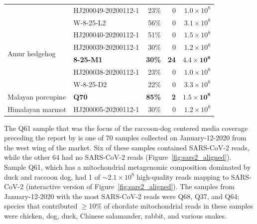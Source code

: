 \documentclass[9pt,twocolumn,twoside]{gsajnl_modified}
\begin{document}
\begin{table}
{\begin{tabular}{llrrr}
                 & HJ200049-20200112-1 &                                23\% &                        0 &                     $1.0 \times 10^8$ \\
\cline{1-5}
\multirow{6}{*}{Amur hedgehog} & W-8-25-L2 &                                56\% &                        0 &                   $3.1 \times 10^8$ \\
                 & HJ200040-20200112-1 &                                51\% &                        0 &                   $1.5 \times 10^8$ \\
                 & HJ200039-20200112-1 &                                30\% &                        0 &                   $1.2 \times 10^8$ \\
                 & {\bf 8-25-M1} &                                {\bf 30\%} &                      {\bf 24} &                   $\mathbf{4.4 \times 10^8}$ \\
                 & HJ200038-20200112-1 &                                23\% &                        0 &                     $1.0 \times 10^8$ \\
                 & W-8-25-D2 &                                22\% &                        0 &                   $3.3 \times 10^8$ \\
\cline{1-5}
Malayan porcupine & {\bf Q70} &                                {\bf 85\%} &                        {\bf 2} &                   $\mathbf{1.5 \times 10^8}$ \\
\cline{1-5}
Himalayan marmot & HJ200005-20200112-1 &                                30\% &                        0 &                   $1.2 \times 10^8$ \\
\bottomrule
\end{tabular}
}
\end{table}

The Q61 sample that was the focus of the raccoon-dog centered media coverage~\citep{wu2023atlantic,mueller2023nytimes} preceding the report by \citet{crits2023genetic} is one of 70 samples collected on January-12-2020 from the west wing of the market.
Six of these samples contained SARS-CoV-2 reads, while the other 64 had no SARS-CoV-2 reads (Figure~\ref{fig:sars2_aligned}).
Sample Q61, which has a mitochondrial metagenomic composition dominated by duck and raccoon dog, had 1 of $\sim2.1 \times 10^8$ high-quality reads mapping to SARS-CoV-2 (interactive version of Figure~\ref{fig:sars2_aligned}).
The samples from January-12-2020 with the most SARS-CoV-2 reads were Q68, Q37, and Q64; species that contributed $\ge$10\% of chordate mitochondrial reads in these samples were chicken, dog, duck, Chinese salamander, rabbit, and various snakes.
\end{document}
